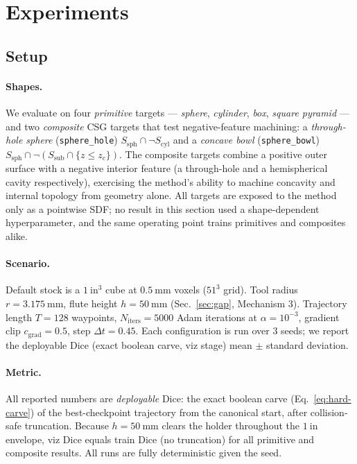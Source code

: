 \section{Experiments}
\label{sec:experiments}

\subsection{Setup}
\label{sec:setup}

\paragraph{Shapes.}
We evaluate on four \emph{primitive} targets --- \emph{sphere}, \emph{cylinder},
\emph{box}, \emph{square pyramid} --- and two \emph{composite} CSG targets that
test negative-feature machining: a \emph{through-hole sphere} (\texttt{sphere\_hole})
$S_{\mathrm{sph}} \cap \neg S_{\mathrm{cyl}}$ and a \emph{concave bowl}
(\texttt{sphere\_bowl}) $S_{\mathrm{sph}} \cap \neg (S_{\mathrm{sub}} \cap
\{z \le z_c\})$. The composite targets combine a positive outer surface with a
negative interior feature (a through-hole and a hemispherical cavity
respectively), exercising the method's ability to machine concavity and
internal topology from geometry alone. All targets are exposed to the method
only as a pointwise SDF; no result in this section used a shape-dependent
hyperparameter, and the same operating point trains primitives and composites
alike.

\paragraph{Scenario.}
Default stock is a $1~\mathrm{in}^3$ cube at $0.5~\mathrm{mm}$ voxels
($51^3$ grid). Tool radius $r{=}3.175~\mathrm{mm}$, flute height
$h{=}50~\mathrm{mm}$ (Sec.~\ref{sec:gap}, Mechanism 3). Trajectory length
$T{=}128$ waypoints, $N_{\mathrm{iters}}{=}5000$ Adam iterations at
$\alpha{=}10^{-3}$, gradient clip $c_{\mathrm{grad}}{=}0.5$, step
$\Delta t{=}0.45$. Each configuration is run over 3 seeds; we report the
deployable Dice (exact boolean carve, viz stage) mean $\pm$ standard deviation.

\paragraph{Metric.}
All reported numbers are \emph{deployable} Dice: the exact boolean carve
(Eq.~\ref{eq:hard-carve}) of the best-checkpoint trajectory from the canonical
start, after collision-safe truncation. Because $h{=}50~\mathrm{mm}$ clears the
holder throughout the $1~\mathrm{in}$ envelope, viz Dice equals train Dice (no
truncation) for all primitive and composite results. All runs are fully
deterministic given the seed.

